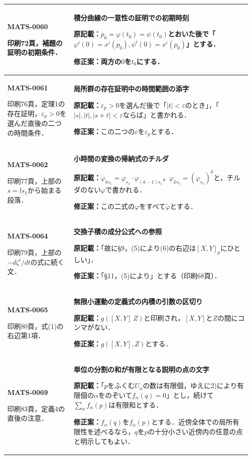 \documentclass[a4paper,10pt]{ltjsarticle}
\begin{document}
\begin{longtable}{@{}>{\raggedright\arraybackslash}p{.19\linewidth}>{\raggedright\arraybackslash}p{.77\linewidth}@{}}
\hline
\hypertarget{MATS-0060}{}\textbf{MATS-0060}\par 印刷72頁，補題の証明の初期条件． & \textbf{積分曲線の一意性の証明での初期時刻}\par\textbf{原記載：}$p_0=\varphi(t_0)=\psi(t_0)$とおいた後で「$\varphi^i(0)=x^i(p_0),\psi^i(0)=x^i(p_0)$」とする．\par\textbf{修正案：}両方の$0$を$t_0$にする． \\[3pt]
\hline
\hypertarget{MATS-0061}{}\textbf{MATS-0061}\par 印刷76頁，定理1の存在証明，$\varepsilon_p>0$を選んだ直後の二つの時間条件． & \textbf{局所群の存在証明中の時間範囲の添字}\par\textbf{原記載：}$\varepsilon_p>0$を選んだ後で「$|t|<\varepsilon$のとき」，「$|s|,|t|,|s+t|<\varepsilon$ならば」と書かれる．\par\textbf{修正案：}この二つの$\varepsilon$を$\varepsilon_p$とする． \\[3pt]
\hline
\hypertarget{MATS-0062}{}\textbf{MATS-0062}\par 印刷77頁，上部の$s=ls_1$から始まる段落． & \textbf{小時間の変換の帰納式のチルダ}\par\textbf{原記載：}$\varphi_{ks_1}=\varphi_{s_1}\cdot\varphi_{(k-1)s_1}$，$\varphi_{ks_1}=(\varphi_{s_1})^k$と，チルダのない$\varphi$で書かれる．\par\textbf{修正案：}この二式の$\varphi$をすべて$\tilde\varphi$とする． \\[3pt]
\hline
\hypertarget{MATS-0064}{}\textbf{MATS-0064}\par 印刷79頁，上部の$-d\zeta^i/dt$の式に続く文． & \textbf{交換子積の成分公式への参照}\par\textbf{原記載：}「故に\S9，(5)により(6)の右辺は$[X,Y]_p$にひとしい」．\par\textbf{修正案：}「\S11，(5)により」とする（印刷68頁）． \\[3pt]
\hline
\hypertarget{MATS-0065}{}\textbf{MATS-0065}\par 印刷80頁，式(1)の右辺第1項． & \textbf{無限小運動の定義式の内積の引数の区切り}\par\textbf{原記載：}$g([X,Y]\ Z)$と印刷され，$[X,Y]$と$Z$の間にコンマがない．\par\textbf{修正案：}$g([X,Y],Z)$とする． \\[3pt]
\hline
\hypertarget{MATS-0069}{}\textbf{MATS-0069}\par 印刷83頁，定義4の直後の注意． & \textbf{単位の分割の和が有限となる説明の点の文字}\par\textbf{原記載：}「$p$をふくむ$U_\alpha$の数は有限個，ゆえに2)により有限個の$\alpha$をのぞいて$f_\alpha(q)=0$」とし，続けて$\sum_\alpha f_\alpha(p)$は有限和とする．\par\textbf{修正案：}$f_\alpha(q)$を$f_\alpha(p)$とする．近傍全体での局所有限性を述べるなら，$q$を$p$の十分小さい近傍内の任意の点と明示してもよい． \\[3pt]

\end{longtable}
\end{document}
